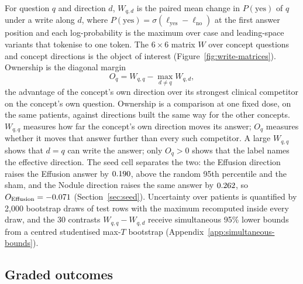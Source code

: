 For question $q$ and direction $d$, $W_{q,d}$ is the paired mean change in $P(\mathrm{yes})$ of $q$ under a write along $d$, where $P(\mathrm{yes})=\sigma(\ell_{\mathrm{yes}}-\ell_{\mathrm{no}})$ at the first answer position and each log-probability is the maximum over case and leading-space variants that tokenise to one token. The $6\times6$ matrix $W$ over concept questions and concept directions is the object of interest (Figure~\ref{fig:write-matrices}). Ownership is the diagonal margin
\begin{equation}
O_q=W_{q,q}-\max_{d\neq q}W_{q,d},
\label{eq:margin}
\end{equation}
the advantage of the concept's own direction over its strongest clinical competitor on the concept's own question. Ownership is a comparison at one fixed dose, on the same patients, against directions built the same way for the other concepts. $W_{q,q}$ measures how far the concept's own direction moves its answer; $O_q$ measures whether it moves that answer further than every such competitor. A large $W_{q,q}$ shows that $d=q$ can write the answer; only $O_q>0$ shows that the label names the effective direction. The seed cell separates the two: the Effusion direction raises the Effusion answer by $0.190$, above the random 95th percentile and the sham, and the Nodule direction raises the same answer by $0.262$, so $O_{\mathrm{Effusion}}=-0.071$ (Section~\ref{sec:seed}). Uncertainty over patients is quantified by 2{,}000 bootstrap draws of test rows with the maximum recomputed inside every draw, and the 30 contrasts $W_{q,q}-W_{q,d}$ receive simultaneous 95\% lower bounds from a centred studentised max-$T$ bootstrap (Appendix~\ref{app:simultaneous-bounds}).

\subsection{Graded outcomes}
\label{sec:grades}

